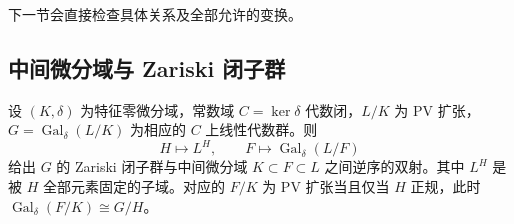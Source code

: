 下一节会直接检查具体关系及全部允许的变换。

\subsection{中间微分域与 Zariski 闭子群}
\label{b5:subsec:E02:03}

\begin{theorem}[微分 Galois 对应]\label{b5:thm:E-galois-correspondence}
	设 \((K,\delta)\) 为特征零微分域，常数域 \(C=\ker\delta\) 代数闭，\(L/K\) 为 PV 扩张，\(G=\operatorname{Gal}_\delta(L/K)\) 为相应的 \(C\) 上线性代数群。则
	\[
		H\longmapsto L^H,\qquad F\longmapsto\operatorname{Gal}_\delta(L/F)
	\]
	给出 \(G\) 的 Zariski 闭子群与中间微分域 \(K\subset F\subset L\) 之间逆序的双射。其中 \(L^H\) 是被 \(H\) 全部元素固定的子域。对应的 \(F/K\) 为 PV 扩张当且仅当 \(H\) 正规，此时 \(\operatorname{Gal}_\delta(F/K)\cong G/H\)。
\end{theorem}

